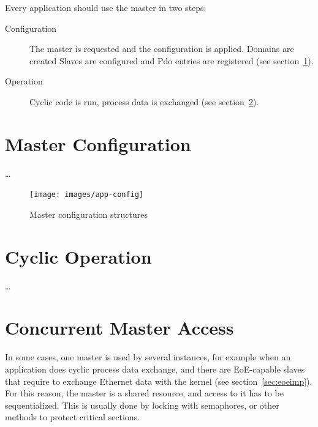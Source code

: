 \documentclass[a4paper,12pt,BCOR6mm,bibtotoc,idxtotoc]{scrbook}
\begin{document}
Every application should use the master in two steps:

\begin{description}

\item[Configuration] The master is requested and the configuration is applied.
Domains are created Slaves are configured and Pdo entries are registered (see
section~\ref{sec:masterconfig}).

\item[Operation] Cyclic code is run, process data is exchanged (see
section~\ref{sec:cyclic}).

\end{description}


\section{Master Configuration}
\label{sec:masterconfig}

\ldots

\begin{figure}[htbp]
  \centering
  \texttt{[image: images/app-config]}
  \caption{Master configuration structures}
  \label{fig:app-config}
\end{figure}


\section{Cyclic Operation}
\label{sec:cyclic}

\ldots



\section{Concurrent Master Access} %
\label{sec:concurr}

In some cases, one master is used by several instances, for example when an
application does cyclic process data exchange, and there are EoE-capable slaves
that require to exchange Ethernet data with the kernel (see
section~\ref{sec:eoeimp}). For this reason, the master is a shared resource,
and access to it has to be sequentialized. This is usually done by locking with
semaphores, or other methods to protect critical sections.
\end{document}

